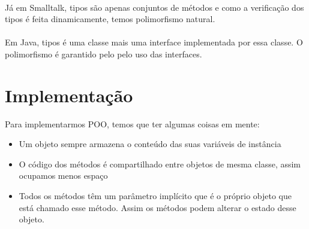 \documentclass[11pt]{article}
\begin{document}
\paragraph{} Já em Smalltalk, tipos são apenas conjuntos de métodos e como a verificação dos tipos é feita dinamicamente, temos
polimorfismo natural.

\paragraph{} Em Java, tipos é uma classe mais uma interface implementada por essa classe. O polimorfismo é garantido pelo pelo uso das
interfaces.
\section{Implementação}
\label{sec:orgc03993b}
Para implementarmos POO, temos que ter algumas coisas em mente:

\begin{itemize}
\item Um objeto sempre armazena o conteúdo das suas variáveis de instância
\item O código dos métodos é compartilhado entre objetos de mesma classe, assim ocupamos menos espaço
\item Todos os métodos têm um parâmetro implícito que é o próprio objeto que está chamado esse método. Assim os métodos podem alterar o estado desse objeto.
\end{itemize}
\end{document}

